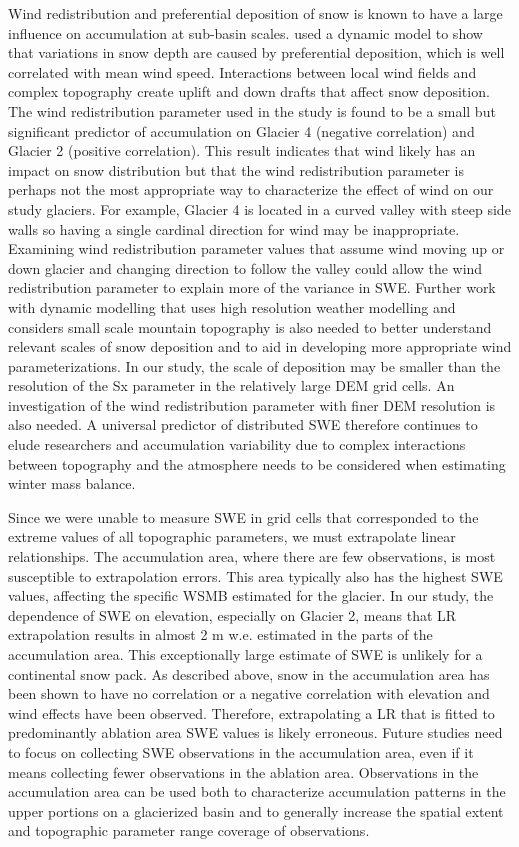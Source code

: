 \documentclass[twocolumn,letterpaper]{igs}
\begin{document}
Wind redistribution and preferential deposition of snow is known to have a large influence on accumulation at sub-basin scales. \cite{Dadic2010} used a dynamic model to show that variations in snow depth are caused by preferential deposition, which is well correlated with mean wind speed. Interactions between local wind fields and complex topography create uplift and down drafts that affect snow deposition. The wind redistribution parameter used in the study is found to be a small but significant predictor of accumulation on Glacier 4 (negative correlation) and Glacier 2 (positive correlation). This result indicates that wind likely has an impact on snow distribution but that the wind redistribution parameter is perhaps not the most appropriate way to characterize the effect of wind on our study glaciers. For example, Glacier 4 is located in a curved valley with steep side walls so having a single cardinal direction for wind may be inappropriate. Examining wind redistribution parameter values that assume wind moving up or down glacier and changing direction to follow the valley could allow the wind redistribution parameter to explain more of the variance in SWE. Further work with dynamic modelling that uses high resolution weather modelling and considers small scale mountain topography is also needed to better understand relevant scales of snow deposition and to aid in developing more appropriate wind parameterizations. In our study, the scale of deposition may be smaller than the resolution of the Sx parameter in the relatively large DEM grid cells. An investigation of the wind redistribution parameter with finer DEM resolution is also needed. A universal predictor of distributed SWE therefore continues to elude researchers and accumulation variability due to complex interactions between topography and the atmosphere needs to be considered when estimating winter mass balance. 

Since we were unable to measure SWE in grid cells that corresponded to the extreme values of all topographic parameters, we must extrapolate linear relationships. The accumulation area, where there are few observations, is most susceptible to extrapolation errors. This area typically also has the highest SWE values, affecting the specific WSMB estimated for the glacier. In our study, the dependence of SWE on elevation, especially on Glacier 2, means that LR extrapolation results in almost 2 m w.e. estimated in the parts of the accumulation area. This exceptionally large estimate of SWE is unlikely for a continental snow pack. As described above, snow in the accumulation area has been shown to have no correlation or a negative correlation with elevation and wind effects have been observed. Therefore, extrapolating a LR that is fitted to predominantly ablation area SWE values is likely erroneous. Future studies need to focus on collecting SWE observations in the accumulation area, even if it means collecting fewer observations in the ablation area. Observations in the accumulation area can be used both to characterize accumulation patterns in the upper portions on a glacierized basin and to generally increase the spatial extent and topographic parameter range coverage of observations.
\end{document}
